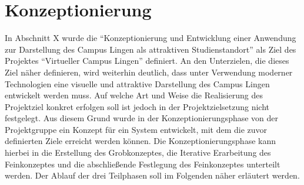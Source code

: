 \section{Konzeptionierung}
\label{sec:Konzeptionierung}

In Abschnitt X wurde die "`Konzeptionierung und Entwicklung
einer Anwendung zur Darstellung des Campus Lingen als attraktiven
Studienstandort"' als Ziel des Projektes "`Virtueller Campus Lingen"'
definiert. An den Unterzielen, die dieses Ziel näher definieren, wird weiterhin
deutlich, dass unter Verwendung moderner Technologien eine visuelle und
attraktive Darstellung des Campus Lingen entwickelt werden muss. Auf welche Art
und Weise die Realisierung des Projektziel konkret erfolgen soll ist jedoch in
der Projektzielsetzung nicht festgelegt. Aus diesem Grund wurde in der
Konzeptionierungsphase von der Projektgruppe ein Konzept für ein System
entwickelt, mit dem die zuvor definierten Ziele erreicht werden können. Die
Konzeptionierungsphase kann hierbei in die Erstellung des Grobkonzeptes, die
Iterative Erarbeitung des Feinkonzeptes und die abschließende Festlegung des
Feinkonzeptes unterteilt werden. Der Ablauf der drei Teilphasen soll im
Folgenden näher erläutert werden.






